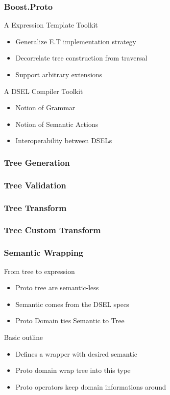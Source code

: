 \begin{frame}
\frametitle{Boost.Proto}
\begin{block}{A Expression Template Toolkit}
\begin{itemize}
\item Generalize E.T implementation strategy
\item Decorrelate tree construction from traversal
\item Support arbitrary extensions
\end{itemize}
\end{block}{}

\begin{block}{A DSEL Compiler Toolkit}
\begin{itemize}
\item Notion of \alert{Grammar}
\item Notion of \alert{Semantic Actions}
\item Interoperability between DSELs
\end{itemize}
\end{block}{}
\end{frame}

\begin{frame}
\frametitle{Tree Generation}
\end{frame}

\begin{frame}
\frametitle{Tree Validation}
\lstprotomatch
\end{frame}

\begin{frame}
\frametitle{Tree Transform}
\lstprotoeval
\end{frame}

\begin{frame}
\frametitle{Tree Custom Transform}
\lstprotoevalcustom
\end{frame}

\begin{frame}
\frametitle{Semantic Wrapping}
\begin{block}{From tree to expression}
\begin{itemize}
\item Proto tree are semantic-less
\item Semantic comes from the DSEL specs
\item Proto Domain ties Semantic to Tree
\end{itemize}
\end{block}{}

\begin{block}{Basic outline}
\begin{itemize}
\item Defines a wrapper with desired semantic
\item Proto domain wrap tree into this type
\item Proto operators keep domain informations around
\end{itemize}
\end{block}{}
\end{frame}

